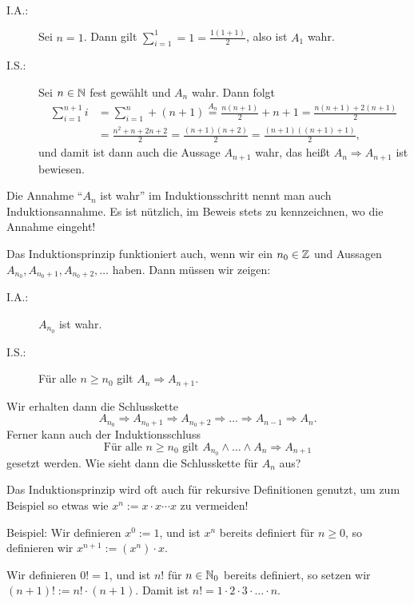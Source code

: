 \begin{beweis}
	\mbox{} \\[-.9cm]
	\begin{description}
		\item[I.A.:] Sei $n=1$.
		Dann gilt $\sum_{i=1}^{1} = 1 = \frac{1(1+1)}{2}$, also ist $A_1$ wahr.
		\item[I.S.:] Sei $n \in \mathbb{N}$ fest gewählt und $A_n$ wahr.
		Dann folgt
		\begin{align*}
			\sum_{i=1}^{n+1} i &= \sum_{i=1}^{n} + (n+1) \stackrel{A_n}{=} \frac{n(n+1)}{2} + n+1 = \frac{n(n+1)+2(n+1)}{2} \\
			&= \frac{n^2 +n +2n +2}{2} = \frac{(n+1)(n+2)}{2} = \frac{(n+1)((n+1)+1)}{2},
		\end{align*}
		und damit ist dann auch die Aussage $A_{n+1}$ wahr, das heißt $A_n \Rightarrow A_{n+1}$ ist bewiesen. \qedhere
	\end{description}
\end{beweis}

Die Annahme \enquote{$A_n$ ist wahr} im Induktionsschritt nennt man auch Induktionsannahme.
Es ist nützlich, im Beweis stets zu kennzeichnen, wo die Annahme eingeht!

\begin{bemerkung}
	\label{bem:I.1.10}
	Das Induktionsprinzip funktioniert auch, wenn wir ein $n_0 \in \mathbb{Z}$ und Aussagen $A_{n_0}, A_{n_0+1}, A_{n_0+2},\dots$ haben.
	Dann müssen wir zeigen:
	\begin{description}
		\item[I.A.:] $A_{n_0}$ ist wahr.
		\item[I.S.:] Für alle $n \geq n_0$ gilt $A_n \Rightarrow A_{n+1}$.
	\end{description}
	Wir erhalten dann die Schlusskette
	\[
		A_{n_0} \Rightarrow A_{n_0+1} \Rightarrow A_{n_0+2} \Rightarrow \dots \Rightarrow A_{n-1} \Rightarrow A_n.
	\]
	Ferner kann auch der Induktionsschluss
	\[
		\text{Für alle } n \geq n_0 \text{ gilt } A_{n_0} \wedge \dots \wedge A_n \Rightarrow A_{n+1}
	\]
	gesetzt werden.
	Wie sieht dann die Schlusskette für $A_n$ aus?
\end{bemerkung}

\begin{beispiel}
	\label{bsp:I.1.11}
	Das Induktionsprinzip wird oft auch für rekursive Definitionen genutzt, um zum Beispiel so etwas wie $x^n := x \cdot x \cdots x$ zu vermeiden!
	
	Beispiel: Wir definieren $x^0 := 1$, und ist $x^n$ bereits definiert für $n \geq 0$, so definieren wir $x^{n+1} := (x^n) \cdot x$.
	
	Wir definieren $0! = 1$, und ist $n!$ für $n \in \mathbb{N}_0$ bereits definiert, so setzen wir $(n+1)! := n! \cdot (n+1)$.
	Damit ist $n! = 1 \cdot 2 \cdot 3 \cdot \dots \cdot n$.
\end{beispiel}

